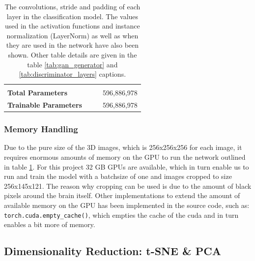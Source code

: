 \documentclass[12pt, fleqn, titlepage]{article}
\newcommand{\1}[1]{\mathds{1}\left[#1\right]}
\begin{document}
\begin{table}[H]
\begin{tabular}{llll}
			&                &             &               \\
			\textbf{Total Parameters}                   &                &             & 596,886,978    \\
			\textbf{Trainable Parameters}               &                &             & 596,886,978    \\ \bottomrule
		\end{tabular}
		\caption{The convolutions, stride and padding of each layer in the classification model. The values used in the activation functions and instance normalization (LayerNorm) as well as when they are used in the network have also been shown. Other table details are given in the table \ref{tab:gan_generator} and \ref{tab:discriminator_layers} captions.}
		\label{cnn_arcitecture}
\end{table}	

	\subsubsection{Memory Handling}
	Due to the pure size of the 3D images, which is 256x256x256 for each image, it requires enormous amounts of memory on the GPU to run the network outlined in table \ref{cnn_arcitecture}. For this project 32 GB GPUs are available, which in turn enable us to run and train the model with a batchsize of one and images cropped to size 256x145x121. The reason why cropping can be used is due to the amount of black pixels around the brain itself. Other implementations to extend the amount of available memory on the GPU has been implemented in the source code, such as: \texttt{torch.cuda.empty\_cache()}, which empties the cache of the cuda and in turn enables a bit more of memory.



\subsection{Dimensionality Reduction: t-SNE \& PCA}
\end{document}

